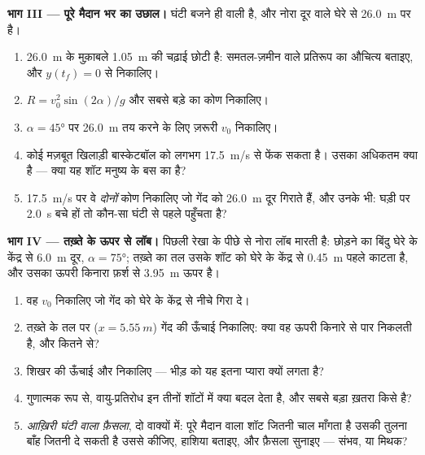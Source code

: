 \begin{problem}
\medskip\noindent\textbf{भाग III --- पूरे मैदान भर का उछाल।} घंटी बजने ही
वाली है, और नोरा दूर वाले घेरे से \qty{26.0}{m} पर है।
\begin{enumerate}[resume]
  \item \qty{26.0}{m} के मुक़ाबले \qty{1.05}{m} की चढ़ाई छोटी है: समतल-ज़मीन वाले प्रतिरूप
        का औचित्य बताइए, और $y(t_f) = 0$ से  निकालिए।
  \item $R = v_0^2\sin(2\alpha)/g$ और सबसे बड़े  का कोण निकालिए।
  \item $\alpha = \ang{45}$ पर \qty{26.0}{m} तय करने के लिए ज़रूरी $v_0$ निकालिए।
  \item कोई मज़बूत खिलाड़ी बास्केटबॉल को लगभग \qty{17.5}{m/s} से फेंक सकता है। उसका
        अधिकतम  क्या है --- क्या यह शॉट मनुष्य के बस का है?
  \item \qty{17.5}{m/s} पर वे \emph{दोनों} कोण निकालिए जो गेंद को \qty{26.0}{m} दूर गिराते
        हैं, और उनके  भी: घड़ी पर \qty{2.0}{s} बचे हों तो कौन-सा घंटी से
        पहले पहुँचता है?
\end{enumerate}

\medskip\noindent\textbf{भाग IV --- तख़्ते के ऊपर से लॉब।} पिछली रेखा के पीछे
से नोरा लॉब मारती है: छोड़ने का बिंदु घेरे के केंद्र से \qty{6.0}{m} दूर, $\alpha = \ang{75}$;
तख़्ते का तल उसके शॉट को घेरे के केंद्र से \qty{0.45}{m} पहले काटता है, और उसका ऊपरी
किनारा फ़र्श से \qty{3.95}{m} ऊपर है।
\begin{enumerate}[resume]
  \item वह $v_0$ निकालिए जो गेंद को घेरे के केंद्र से नीचे गिरा दे।
  \item तख़्ते के तल पर ($x = \qty{5.55}{m}$) गेंद की ऊँचाई निकालिए: क्या वह ऊपरी किनारे
        से पार निकलती है, और कितने से?
  \item शिखर की ऊँचाई और  निकालिए --- भीड़ को यह इतना प्यारा क्यों
        लगता है?
  \item गुणात्मक रूप से, वायु-प्रतिरोध इन तीनों शॉटों में क्या बदल देता है,
        और सबसे बड़ा ख़तरा किसे है?
  \item \emph{आख़िरी घंटी वाला फ़ैसला}, दो वाक्यों में: पूरे मैदान वाला शॉट
        जितनी चाल माँगता है उसकी तुलना बाँह जितनी दे सकती है उससे कीजिए,
        हाशिया बताइए, और फ़ैसला सुनाइए --- संभव, या मिथक?
\end{enumerate}
\end{problem}
